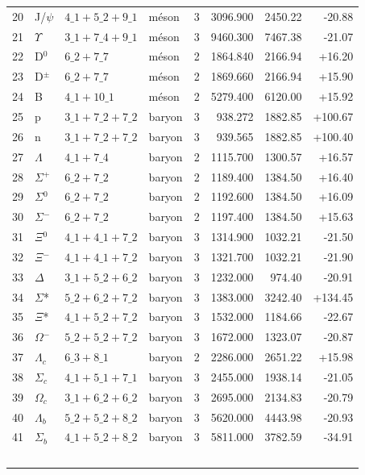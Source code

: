 \begin{center}
\begin{longtable}{rlllrrrr}
  20 & J/$\psi$ & $4\_1{+}5\_2{+}9\_1$ & méson & 3 & 3096.900 & 2450.22 & -20.88 \\
  21 & $\Upsilon$ & $3\_1{+}7\_4{+}9\_1$ & méson & 3 & 9460.300 & 7467.38 & -21.07 \\
  22 & D$^0$ & $6\_2{+}7\_7$ & méson & 2 & 1864.840 & 2166.94 & +16.20 \\
  23 & D$^\pm$ & $6\_2{+}7\_7$ & méson & 2 & 1869.660 & 2166.94 & +15.90 \\
  24 & B & $4\_1{+}10\_1$ & méson & 2 & 5279.400 & 6120.00 & +15.92 \\
  25 & p & $3\_1{+}7\_2{+}7\_2$ & baryon & 3 & 938.272 & 1882.85 & +100.67 \\
  26 & n & $3\_1{+}7\_2{+}7\_2$ & baryon & 3 & 939.565 & 1882.85 & +100.40 \\
  27 & $\Lambda$ & $4\_1{+}7\_4$ & baryon & 2 & 1115.700 & 1300.57 & +16.57 \\
  28 & $\Sigma$$^+$ & $6\_2{+}7\_2$ & baryon & 2 & 1189.400 & 1384.50 & +16.40 \\
  29 & $\Sigma$$^0$ & $6\_2{+}7\_2$ & baryon & 2 & 1192.600 & 1384.50 & +16.09 \\
  30 & $\Sigma$$^-$ & $6\_2{+}7\_2$ & baryon & 2 & 1197.400 & 1384.50 & +15.63 \\
  31 & $\Xi$$^0$ & $4\_1{+}4\_1{+}7\_2$ & baryon & 3 & 1314.900 & 1032.21 & -21.50 \\
  32 & $\Xi$$^-$ & $4\_1{+}4\_1{+}7\_2$ & baryon & 3 & 1321.700 & 1032.21 & -21.90 \\
  33 & $\Delta$ & $3\_1{+}5\_2{+}6\_2$ & baryon & 3 & 1232.000 & 974.40 & -20.91 \\
  34 & $\Sigma$* & $5\_2{+}6\_2{+}7\_2$ & baryon & 3 & 1383.000 & 3242.40 & +134.45 \\
  35 & $\Xi$* & $4\_1{+}5\_2{+}7\_2$ & baryon & 3 & 1532.000 & 1184.66 & -22.67 \\
  36 & $\Omega$$^-$ & $5\_2{+}5\_2{+}7\_2$ & baryon & 3 & 1672.000 & 1323.07 & -20.87 \\
  37 & $\Lambda$$_c$ & $6\_3{+}8\_1$ & baryon & 2 & 2286.000 & 2651.22 & +15.98 \\
  38 & $\Sigma$$_c$ & $4\_1{+}5\_1{+}7\_1$ & baryon & 3 & 2455.000 & 1938.14 & -21.05 \\
  39 & $\Omega$$_c$ & $3\_1{+}6\_2{+}6\_2$ & baryon & 3 & 2695.000 & 2134.83 & -20.79 \\
  40 & $\Lambda$$_b$ & $5\_2{+}5\_2{+}8\_2$ & baryon & 3 & 5620.000 & 4443.98 & -20.93 \\
  41 & $\Sigma$$_b$ & $4\_1{+}5\_2{+}8\_2$ & baryon & 3 & 5811.000 & 3782.59 & -34.91 \\
$$
\end{longtable}
\end{center}
